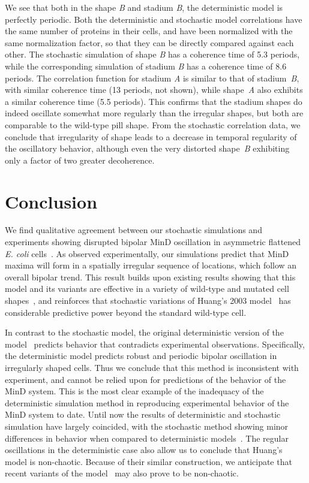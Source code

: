 \documentclass[10pt,letterpaper]{article}
\newcommand{\changed}[1]{{\color{red}#1}}
\begin{document}
We see that both in the shape \emph{B} and stadium \emph{B}, the
deterministic model is perfectly periodic.  Both the deterministic and
stochastic model correlations have the same number of proteins in
their cells, and have been normalized with the same normalization
factor, so that they can be directly compared against each other.  The
stochastic simulation of shape \emph{B} has a coherence time of 5.3
periods, while the corresponding simulation of stadium \emph{B} has a
coherence time of 8.6 periods.
%
The correlation function for stadium \emph{A} is similar to that of
stadium~\emph{B}, with similar coherence time (13 periods, not shown),
while shape~\emph{A} also exhibits a similar coherence time (5.5
periods).  This confirms that the stadium shapes do indeed oscillate
somewhat more regularly than the irregular shapes, but both are
comparable to the wild-type pill shape.
%
From the stochastic correlation data, we conclude that irregularity of
shape leads to a decrease in temporal regularity of the oscillatory
behavior, although even the very distorted shape~\emph{B} exhibiting
only a factor of two greater decoherence.

\section*{Conclusion}
We find qualitative agreement between our stochastic simulations and
experiments showing disrupted bipolar MinD oscillation in asymmetric
flattened \changed{\emph{E. coli}} cells~\cite{mannik2012robustness}.  As observed
experimentally, our simulations predict that MinD maxima will form in
a spatially irregular sequence of locations, which follow an overall
bipolar trend.  This result builds upon existing results showing that
this model and its variants are effective in a variety of wild-type
and mutated cell shapes~\cite{fange2006noise, varma2008min,
  kruse2007experimentalist}, and reinforces that stochastic variations
of Huang's 2003 model~\cite{fange2006noise, kerr2006division} has
considerable predictive power beyond the standard wild-type cell.

In contrast to the stochastic model, the original deterministic
version of the model~\cite{huang2003dynamic} predicts behavior that
contradicts experimental observations.  Specifically, the
deterministic model predicts robust and periodic bipolar oscillation
in irregularly shaped cells.  Thus we conclude that this method is
inconsistent with experiment, and cannot be relied upon for
predictions of the behavior of the MinD system.  This is the most
clear example of the inadequacy of the deterministic simulation method
in reproducing experimental behavior of the MinD system to date.
Until now the results of deterministic and stochastic simulation have
largely coincided, with the stochastic method showing minor
differences in behavior when compared to deterministic
models~\cite{kerr2006division, fange2006noise, huang2004min,
  kruse2007experimentalist}.  The regular oscillations in the
deterministic case also allow us to conclude that Huang's model is
non-chaotic.  Because of their similar construction, we anticipate
that recent variants of the model~\cite{bonny2013membrane,
  fange2006noise, halatek2012highly} may also prove to be
non-chaotic.
\end{document}
